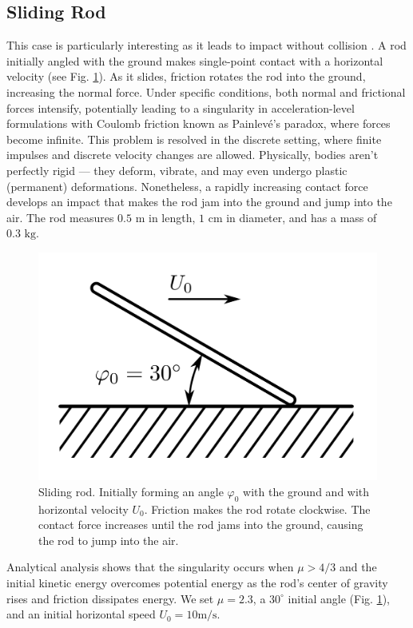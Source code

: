 \subsection{Sliding Rod}
\label{sec:sliding_rod}

This case is particularly interesting as it leads to impact without collision
\cite[\S 5.3]{bib:pfeiffer1996multibody}. A rod initially angled with the ground
makes single-point contact with a horizontal velocity (see Fig.
\ref{fig:sliding_rod_setup}). As it slides, friction rotates the rod into the
ground, increasing the normal force. Under specific conditions, both normal and
frictional forces intensify, potentially leading to a singularity in
acceleration-level formulations with Coulomb friction known as Painlev\'e's
paradox, where forces become infinite. This problem is resolved in the discrete
setting, where finite impulses and discrete velocity changes are allowed.
Physically, bodies aren't perfectly rigid --- they deform, vibrate, and may
even undergo plastic (permanent) deformations. Nonetheless, a rapidly increasing
contact force develops an impact that makes the rod jam into the ground and jump
into the air. The rod measures $0.5\text{ m}$ in length, $1\text{ cm}$ in
diameter, and has a mass of $0.3\text{ kg}$.

\begin{figure}[!h]
    \centering
    \includegraphics[width=0.55\columnwidth]{figures/TestCases/SlidingRod/sliding_rod_schematic.png}
    \caption{Sliding rod. Initially forming an angle $\varphi_0$ with the ground
    and with horizontal velocity $U_0$. Friction makes the rod rotate clockwise.
    The contact force increases until the rod jams into the ground, causing the
    rod to jump into the air.}
    \label{fig:sliding_rod_setup}
\end{figure}

Analytical analysis \cite[\S 5.3]{bib:pfeiffer1996multibody} shows that the
singularity occurs when $\mu>4/3$ and the initial kinetic energy overcomes
potential energy as the rod's center of gravity rises and friction dissipates
energy. We set $\mu=2.3$, a $30^\circ$ initial angle (Fig.
\ref{fig:sliding_rod_setup}), and an initial horizontal speed $U_0=10\text{
m}/\text{s}$.

